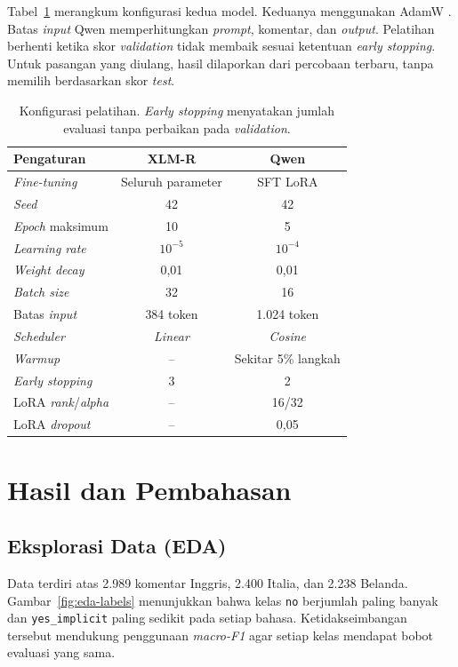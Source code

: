\documentclass[11pt]{article}
\begin{document}
Tabel~\ref{tab:configuration} merangkum konfigurasi kedua model. Keduanya menggunakan AdamW \citep{loshchilov-hutter-2019-decoupled}. Batas \textit{input} Qwen memperhitungkan \textit{prompt}, komentar, dan \textit{output}. Pelatihan berhenti ketika skor \textit{validation} tidak membaik sesuai ketentuan \textit{early stopping}. Untuk pasangan yang diulang, hasil dilaporkan dari percobaan terbaru, tanpa memilih berdasarkan skor \textit{test}.

\begin{table}[t]
\centering\small
\setlength{\tabcolsep}{2.5pt}
\begin{tabular}{lcc}
\toprule
Pengaturan & XLM-R & Qwen \\
\midrule
\textit{Fine-tuning} & Seluruh parameter & SFT LoRA \\
\textit{Seed} & 42 & 42 \\
\textit{Epoch} maksimum & 10 & 5 \\
\textit{Learning rate} & $10^{-5}$ & $10^{-4}$ \\
\textit{Weight decay} & 0,01 & 0,01 \\
\textit{Batch size} & 32 & 16 \\
Batas \textit{input} & 384 token & 1.024 token \\
\textit{Scheduler} & \textit{Linear} & \textit{Cosine} \\
\textit{Warmup} & -- & Sekitar 5\% langkah \\
\textit{Early stopping} & 3 & 2 \\
LoRA \textit{rank}/\textit{alpha} & -- & 16/32 \\
LoRA \textit{dropout} & -- & 0,05 \\
\bottomrule
\end{tabular}
\caption{Konfigurasi pelatihan. \textit{Early stopping} menyatakan jumlah evaluasi tanpa perbaikan pada \textit{validation}.}
\label{tab:configuration}
\end{table}

\section{Hasil dan Pembahasan}
\subsection{Eksplorasi Data (EDA)}
Data terdiri atas 2.989 komentar Inggris, 2.400 Italia, dan 2.238 Belanda. Gambar~\ref{fig:eda-labels} menunjukkan bahwa kelas \texttt{no} berjumlah paling banyak dan \texttt{yes\_implicit} paling sedikit pada setiap bahasa. Ketidakseimbangan tersebut mendukung penggunaan \textit{macro-F1} agar setiap kelas mendapat bobot evaluasi yang sama.
\end{document}
